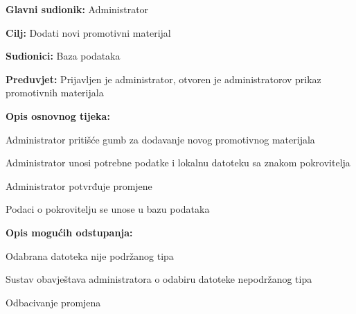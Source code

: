 					\noindent {}
					\begin{packed_item}
						
						\item \textbf{Glavni sudionik: }Administrator
						\item  \textbf{Cilj:} Dodati novi promotivni materijal
						\item  \textbf{Sudionici:} Baza podataka
						\item  \textbf{Preduvjet:} Prijavljen je administrator, otvoren je administratorov prikaz promotivnih materijala
						\item  \textbf{Opis osnovnog tijeka:}
						
						\item[] \begin{packed_enum}
							
							\item Administrator pritišće gumb za dodavanje novog promotivnog materijala
							\item Administrator unosi potrebne podatke i lokalnu datoteku sa znakom pokrovitelja
							\item Administrator potvrđuje promjene
							\item Podaci o pokrovitelju se unose u bazu podataka
							
						\end{packed_enum}
						
						\item  \textbf{Opis mogućih odstupanja:}
						
						\item[] \begin{packed_item}
							
							\item[2.a] Odabrana datoteka nije podržanog tipa
							\item[] \begin{packed_enum}
								
								\item Sustav obavještava administratora o odabiru datoteke nepodržanog tipa
								\item Odbacivanje promjena
								
							\end{packed_enum}
							
						\end{packed_item}
					\end{packed_item}
					
